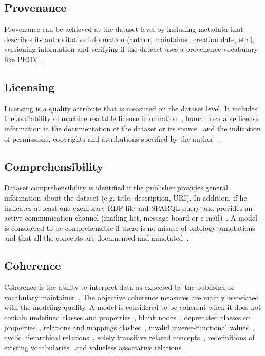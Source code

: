 \subsection{Provenance}
Provenance can be achieved at the dataset level by including metadata that describes its authoritative information (author, maintainer, creation date, etc.), versioning information and verifying if the dataset uses a provenance vocabulary like PROV~\cite{Lebo:W3C:13}.

\subsection{Licensing}
Licensing is a quality attribute that is measured on the dataset level. It includes the availability of machine readable license information~\cite{Hogan:WebSemJorunal:12}, human readable license information in the documentation of the dataset or its source~\cite{Hogan:WebSemJorunal:12} and the indication of permissions, copyrights and attributions specified by the author~\cite{Zaveri:SemWebJorunal:12}.

\subsection{Comprehensibility}
Dataset comprehensibility is identified if the publisher provides general information about the dataset (e.g. title, description, URI). In addition, if he indicates at least one exemplary RDF file and SPARQL query and provides an active communication channel (mailing list, message board or e-mail)~\cite{Flemming:Thesis:10}. A model is considered to be comprehensible if there is no misuse of ontology annotations and that all the concepts are documented and annotated~\cite{Mader:TBDL:12,Maria:KEOD:13}.

\subsection{Coherence}
Coherence is the ability to interpret data as expected by the publisher or vocabulary maintainer~\cite{Hogan:LDOW:10}. The objective coherence measures are mainly associated with the modeling quality. A model is considered to be coherent when it does not contain undefined classes and properties~\cite{Hogan:LDOW:10}, blank nodes~\cite{Hogan:WebSemJorunal:12}, deprecated classes or properties~\cite{Hogan:LDOW:10}, relations and mappings clashes~\cite{Suominen:IKEM:12}, invalid inverse-functional values~\cite{Hogan:LDOW:10}, cyclic hierarchical relations~\cite{Dagobert:DL:02,Suominen:IKEM:12,Mader:TBDL:12}, solely transitive related concepts~\cite{Mader:TBDL:12}, redefinitions of existing vocabularies~\cite{Hogan:LDOW:10} and valueless associative relations~\cite{Mader:TBDL:12}.

